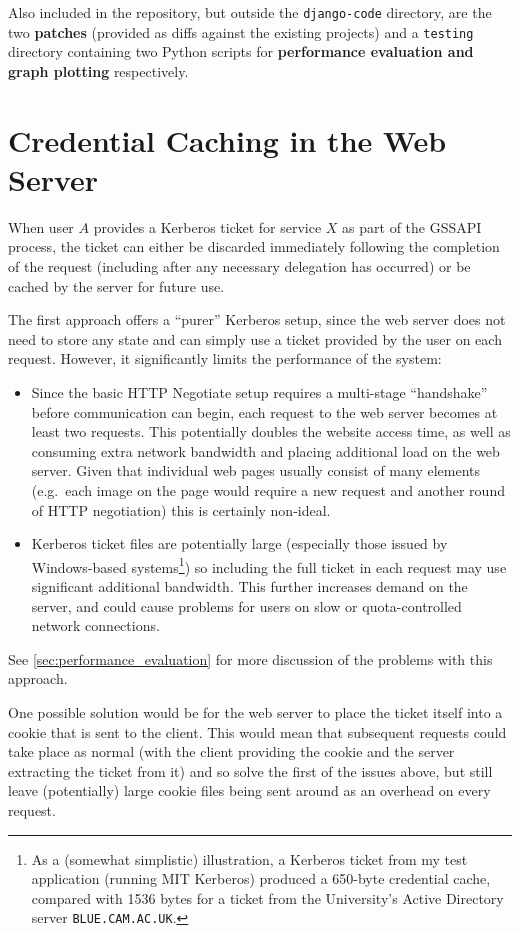 \documentclass[12pt]{report}
\begin{document}
Also included in the repository, but outside the \verb+django-code+ directory, are the two \textbf{patches} (provided as diffs against the existing projects) and a \verb+testing+ directory containing two Python scripts for \textbf{performance evaluation and graph plotting} respectively.

\section{Credential Caching in the Web Server}
\label{sec:credential_caching}
When user $A$ provides a Kerberos ticket for service $X$ as part of the GSSAPI process, the ticket can either be discarded immediately following the completion of the request (including after any necessary delegation has occurred) or be cached by the server for future use.

The first approach offers a ``purer'' Kerberos setup, since the web server does not need to store any state and can simply use a ticket provided by the user on each request. However, it significantly limits the performance of the system:
\begin{itemize}
\item
  Since the basic HTTP Negotiate setup requires a multi-stage ``handshake'' before communication can begin, each request to the web server becomes at least two requests. This potentially doubles the website access time, as well as consuming extra network bandwidth and placing additional load on the web server. Given that individual web pages usually consist of many elements (e.g.\ each image on the page would require a new request and another round of HTTP negotiation) this is certainly non-ideal.
\item
  Kerberos ticket files are potentially large (especially those issued by Windows-based systems\footnote{As a (somewhat simplistic) illustration, a Kerberos ticket from my test application (running MIT Kerberos) produced a 650-byte credential cache, compared with 1536 bytes for a ticket from the University's Active Directory server \texttt{BLUE.CAM.AC.UK}.}) so including the full ticket in each request may use significant additional bandwidth. This further increases demand on the server, and could cause problems for users on slow or quota-controlled network connections.
\end{itemize}

See \autoref{sec:performance_evaluation} for more discussion of the problems with this approach.

One possible solution would be for the web server to place the ticket itself into a cookie that is sent to the client. This would mean that subsequent requests could take place as normal (with the client providing the cookie and the server extracting the ticket from it) and so solve the first of the issues above, but still leave (potentially) large cookie files being sent around as an overhead on every request.
\end{document}
